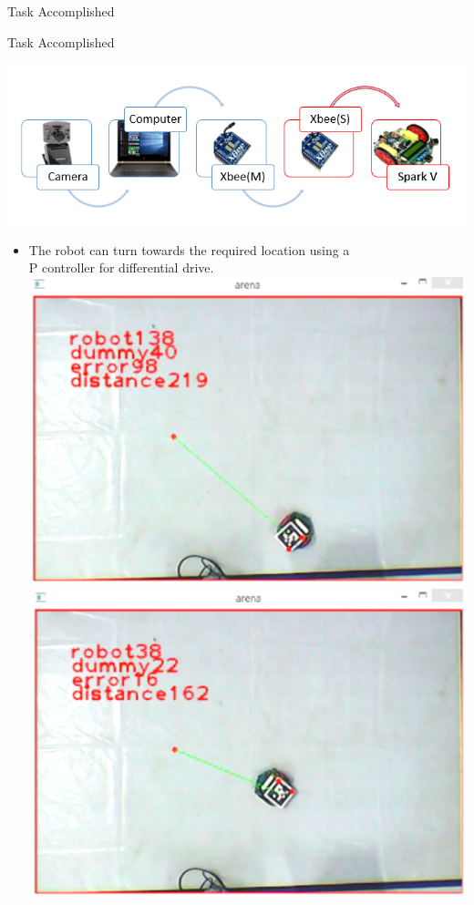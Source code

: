 \documentclass[11pt, a4paper]{beamer}
\begin{document}
\begin{frame}{Task Accomplished}
\begin{itemize}
\begin{center}
			\end{center}
\end{itemize}
\end{frame}

\begin{frame}{Task Accomplished}

\includegraphics[scale =.4]{images/flow.png}
\begin{itemize}
		\item The robot can turn towards the required location using a\\ P controller for differential drive.\\\includegraphics[scale =.35]{images/snip0.png}\includegraphics[scale =.35]{images/snip1.png}\\
	\end{itemize}
\end{frame}
\end{document}

